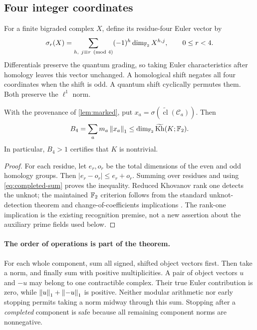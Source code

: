 \subsection{Four integer coordinates}

For a finite bigraded complex $X$, define its residue-four Euler vector by
\begin{equation}
 \sigma_r(X)=\sum_{h,\ j\equiv r\pmod4}(-1)^h\dim_{\mathbb F_2}X^{h,j},
 \qquad 0\le r<4.
 \label{eq:sigma}
\end{equation}
Differentials preserve the quantum grading, so taking Euler characteristics
after homology leaves this vector unchanged. A homological shift negates all
four coordinates when the shift is odd. A quantum shift cyclically permutes
them. Both preserve the $\ell^1$ norm.

\begin{proposition}
\label{prop:B4}
With the provenance of \cref{lem:marked}, put
$x_a=\sigma(\widetilde{\operatorname{cl}}(\mathcal C_a))$. Then
\[
 B_4=\sum_a m_a\left\lVert x_a\right\rVert_1
 \le\dim_{\mathbb F_2}\widetilde{\operatorname{Kh}}(K;\mathbb F_2).
\]
In particular, $B_4>1$ certifies that $K$ is nontrivial.
\end{proposition}
\begin{proof}
For each residue, let $e_r,o_r$ be the total dimensions of the even and odd
homology groups. Then $|e_r-o_r|\le e_r+o_r$. Summing over residues and
using \cref{eq:completed-sum} proves the inequality. Reduced Khovanov rank one
detects the unknot; the maintained $\mathbb F_2$ criterion follows from the standard
unknot-detection theorem and change-of-coefficients implications
\cite{kronheim}. The rank-one implication is the existing recognition premise,
not a new assertion about the auxiliary prime fields used below.
\end{proof}

\paragraph{The order of operations is part of the theorem.}
For each whole component, sum all signed, shifted object vectors first. Then
take a norm, and finally sum with positive multiplicities. A pair of object
vectors $u$ and $-u$ may belong to one contractible complex. Their true Euler
contribution is zero, while $\left\lVert u\right\rVert_1+\left\lVert -u\right\rVert_1$ is positive. Neither modular
arithmetic nor early stopping permits taking a norm midway through this sum.
Stopping after a \emph{completed} component is safe because all remaining
component norms are nonnegative.

